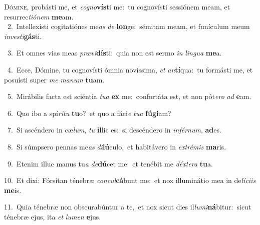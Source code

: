 \lettrine{\initial\textcolor{\initialcolor}{D}}{ómine,} probásti me, et \textit{co}\-\textit{gno}\textbf{vís}ti me:~\star tu cognovísti sessiónem meam, et resurrec\-\textit{ti}\-\textit{ó}\textit{nem} \textbf{me}\-am.\\
{\numbfont\textcolor{\numbcolor}{~2.}}~Intellexísti cogitatiónes me\textit{as} \textit{de} \textbf{lon}\-ge:~\star sémitam meam, et funículum meum \textit{in}\-\textit{ves}\textit{ti}\textbf{gás}ti.\par
{\numbfont\textcolor{\numbcolor}{~3.}}~Et omnes vias meas \textit{præ}\-\textit{vi}\textbf{dís}ti:~\star quia non est sermo \textit{in} \textit{lin}\-\textit{gua} \textbf{me}\-a.\par
{\numbfont\textcolor{\numbcolor}{~4.}}~Ecce, Dómine, tu cognovísti ómnia novíssima, \textit{et} \textit{an}\-\textbf{tí}qua:~\star tu formásti me, et posuísti super \textit{me} \textit{ma}\-\textit{num} \textbf{tu}\-am.\par
{\numbfont\textcolor{\numbcolor}{~5.}}~Mirábilis facta est sciéntia \textit{tu}\-\textit{a} \textbf{ex} me:~\star confortáta est, et non pót\-\textit{e}\-\textit{ro} \textit{ad} \textbf{e}\-am.\par
{\numbfont\textcolor{\numbcolor}{~6.}}~Quo ibo a spí\-\textit{ri}\-\textit{tu} \textbf{tu}\-o?~\star et quo a fáci\textit{e} \textit{tu}\-\textit{a} \textbf{fú}\-\textbf{gi}am?\par
{\numbfont\textcolor{\numbcolor}{~7.}}~Si ascéndero in cæ\-\textit{lum}\-, \textit{tu} \textbf{il}\-lic es:~\star si descéndero in \textit{in}\-\textit{fér}\textit{num}, \textbf{ad}\-es.\par
{\numbfont\textcolor{\numbcolor}{~8.}}~Si súmpsero pennas me\textit{as} \textit{di}\-\textbf{lú}culo,~\star et habitávero in \textit{ex}\-\textit{tré}\textit{mis} \textbf{ma}\-ris.\par
{\numbfont\textcolor{\numbcolor}{~9.}}~Etenim illuc manus tu\textit{a} \textit{de}\-\textbf{dú}cet me:~\star et tenébit me \textit{déx}\-\textit{te}\textit{ra} \textbf{tu}\-a.\par
{\numbfont\textcolor{\numbcolor}{10.}}~Et dixi: Fórsitan ténebræ \textit{con}\-\textit{cul}\textbf{cá}bunt me:~\star et nox illuminátio mea in de\-\textit{lí}\-\textit{ci}\textit{is} \textbf{me}\-is.\par
{\numbfont\textcolor{\numbcolor}{11.}}~Quia ténebræ non obscurabúntur a te,~\dagger et nox sicut dies il\-\textit{lu}\-\textit{mi}\textbf{ná}bitur:~\star sicut ténebræ ejus, ita \textit{et} \textit{lu}\-\textit{men} \textbf{e}\-jus.\par
